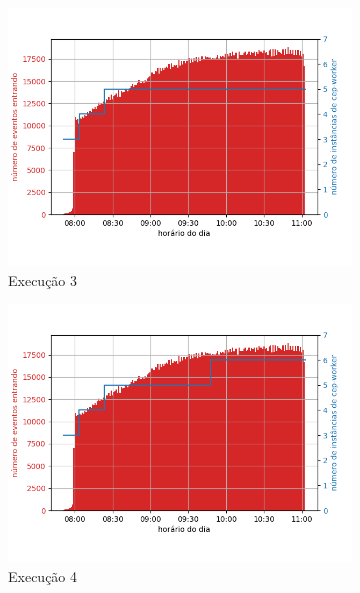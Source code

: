 \begin{figure}[p]
\begin{subfigure}{.5\textwidth}
  \centering
  \includegraphics[width=\linewidth]{figuras/graphics/carga_e_workers_horario8-dez-is.png}  
  \caption{Execução 3}
  \label{fig:cewh-8-dez-is}
\end{subfigure}
\begin{subfigure}{.5\textwidth}
  \centering
  \includegraphics[width=\linewidth]{figuras/graphics/carga_e_workers_horario9-dez-is.png}  
  \caption{Execução 4}
  \label{fig:cewh-9-dez-is}
\end{subfigure}
\begin{subfigure}{.5\textwidth}
  \centering

\end{subfigure}
\end{figure}
